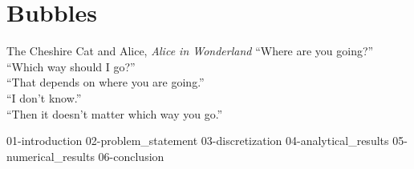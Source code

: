 \chapter{\label{ch:bubbles}Bubbles}

\begin{frontquote}{The Cheshire Cat and Alice, \emph{Alice in Wonderland}}
  ``Where are you going?'' \\
``Which way should I go?'' \\
``That depends on where you are going.'' \\
``I don’t know.'' \\
``Then it doesn’t matter which way you go.''\\
\end{frontquote}


{01-introduction}
{02-problem_statement}
{03-discretization}
{04-analytical_results}
{05-numerical_results}
{06-conclusion}
